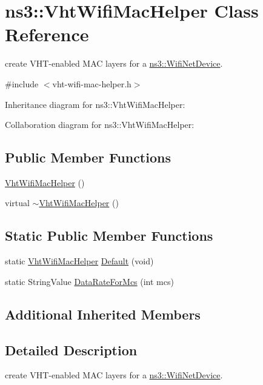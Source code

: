 \hypertarget{classns3_1_1VhtWifiMacHelper}{}\section{ns3\+:\+:Vht\+Wifi\+Mac\+Helper Class Reference}
\label{classns3_1_1VhtWifiMacHelper}


create V\+H\+T-\/enabled M\+AC layers for a \hyperlink{classns3_1_1WifiNetDevice}{ns3\+::\+Wifi\+Net\+Device}.  




{\ttfamily \#include $<$vht-\/wifi-\/mac-\/helper.\+h$>$}



Inheritance diagram for ns3\+:\+:Vht\+Wifi\+Mac\+Helper\+:


Collaboration diagram for ns3\+:\+:Vht\+Wifi\+Mac\+Helper\+:
\subsection*{Public Member Functions}
\begin{DoxyCompactItemize}
\item 
\hyperlink{classns3_1_1VhtWifiMacHelper_ab4474c60c5a91c2dab2b13a384b0d74a}{Vht\+Wifi\+Mac\+Helper} ()
\item 
virtual \hyperlink{classns3_1_1VhtWifiMacHelper_a039028293a18d1710ae89f9851c45629}{$\sim$\+Vht\+Wifi\+Mac\+Helper} ()
\end{DoxyCompactItemize}
\subsection*{Static Public Member Functions}
\begin{DoxyCompactItemize}
\item 
static \hyperlink{classns3_1_1VhtWifiMacHelper}{Vht\+Wifi\+Mac\+Helper} \hyperlink{classns3_1_1VhtWifiMacHelper_ab9624749f88c87f122e1ae2e086fd924}{Default} (void)
\item 
static String\+Value \hyperlink{classns3_1_1VhtWifiMacHelper_a7a6894a89ed440e8aa9151575f6208f9}{Data\+Rate\+For\+Mcs} (int mcs)
\end{DoxyCompactItemize}
\subsection*{Additional Inherited Members}


\subsection{Detailed Description}
create V\+H\+T-\/enabled M\+AC layers for a \hyperlink{classns3_1_1WifiNetDevice}{ns3\+::\+Wifi\+Net\+Device}. 


